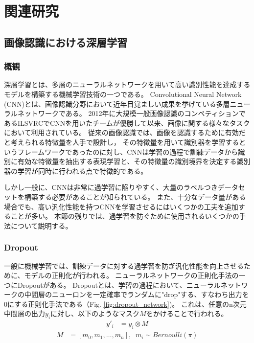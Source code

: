 \chapter{関連研究}

\section{画像認識における深層学習}
\subsection{概観}
深層学習とは、多層のニューラルネットワークを用いて高い識別性能を達成するモデルを構築する機械学習技術の一つである。
Convolutional Neural Network (CNN)とは、画像認識分野において近年目覚ましい成果を挙げている多層ニューラルネットワークである。
2012年に大規模一般画像認識のコンペティションであるILSVRC\cite{ILSVRC15}でCNNを用いたチームが優勝して以来、画像に関する様々なタスクにおいて利用されている。
従来の画像認識では、画像を認識するために有効だと考えられる特徴量を人手で設計し，
その特徴量を用いて識別器を学習するというフレームワークであったのに対し、CNNは学習の過程で訓練データから識別に有効な特徴量を抽出する表現学習と、その特徴量の識別境界を決定する識別器の学習が同時に行われる点で特徴的である。

しかし一般に、CNNは非常に過学習に陥りやすく、大量のラベルつきデータセットを構築する必要があることが知られている。
また、十分なデータ量がある場合でも、高い汎化性能を持つCNNを学習させるにはいくつかの工夫を追加することが多い。
本節の残りでは、過学習を防ぐために使用されるいくつかの手法について説明する。

\subsection{Dropout}
一般に機械学習では、訓練データに対する過学習を防ぎ汎化性能を向上させるために、モデルの正則化が行われる。
ニューラルネットワークの正則化手法の一つにDropout\cite{hinton2012improving, srivastava2014dropout}がある。
Dropoutとは、学習の過程において、ニューラルネットワークの中間層のニューロンを一定確率でランダムに"drop"する、すなわち出力を0にする正則化手法である（Fig. \ref{fig:dropout_network})。
これは、任意のn次元中間層の出力$y_i$に対し、以下のようなマスク$M$をかけることで行われる。
\begin{eqnarray*}
    y'_i &= y_i \otimes M 
\end{eqnarray*}
\begin{eqnarray*}
    M &= [m_0, m_1, \dots, m_n],\;\; m_i \sim Bernoulli(\pi) 
\end{eqnarray*}


